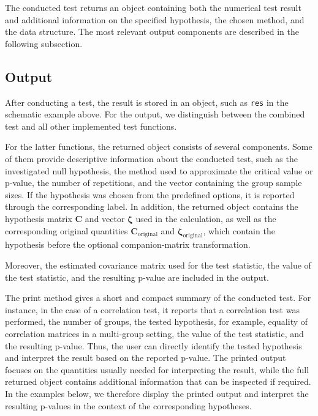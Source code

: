 The conducted test returns an object containing both the numerical test result
and additional information on the specified hypothesis, the chosen method, and
the data structure. The most relevant output components are described in the
following subsection.

\subsection{Output}\label{output}

After conducting a test, the result is stored in an object, such as \texttt{res} in
the schematic example above. For the output, we distinguish between the
combined test and all other implemented test functions.

For the latter functions, the returned object consists of several components.
Some of them provide descriptive information about the conducted test, such as
the investigated null hypothesis, the method used to approximate the critical
value or p-value, the number of repetitions, and the vector containing the group
sample sizes. If the hypothesis was chosen from the predefined options, it is reported through the corresponding label. In addition, the returned object contains the hypothesis matrix \(\boldsymbol{C}\) and vector \(\boldsymbol{\zeta}\) used in the calculation, as well as the corresponding original quantities \(\boldsymbol{C}_{\mathrm{original}}\) and \(\boldsymbol{\zeta}_{\mathrm{original}}\), which contain the hypothesis before the optional companion-matrix transformation.

Moreover, the estimated covariance matrix used for the test statistic, the
value of the test statistic, and the resulting p-value are included in the
output.

The print method gives a short and compact summary of the conducted test. For
instance, in the case of a correlation test, it reports that a correlation test
was performed, the number of groups, the tested hypothesis, for example, equality
of correlation matrices in a multi-group setting, the value of the test
statistic, and the resulting p-value. Thus, the user can directly identify the
tested hypothesis and interpret the result based on the reported p-value. The
printed output focuses on the quantities usually needed for interpreting the
result, while the full returned object contains additional information that can
be inspected if required. In the examples below, we therefore display the
printed output and interpret the resulting p-values in the context of the
corresponding hypotheses.

